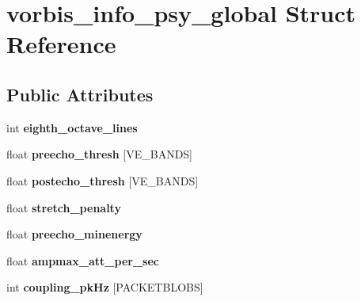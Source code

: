 \hypertarget{structvorbis__info__psy__global}{\section{vorbis\+\_\+info\+\_\+psy\+\_\+global Struct Reference}
\label{structvorbis__info__psy__global}
}
\subsection*{Public Attributes}
\begin{DoxyCompactItemize}
\item 
\hypertarget{structvorbis__info__psy__global_a88e8cf9fc8dd0de7562379558c4a1910}{int {\bfseries eighth\+\_\+octave\+\_\+lines}}\label{structvorbis__info__psy__global_a88e8cf9fc8dd0de7562379558c4a1910}

\item 
\hypertarget{structvorbis__info__psy__global_a6c556b0f7a648c916c9ff2042d1e63ab}{float {\bfseries preecho\+\_\+thresh} \mbox{[}V\+E\+\_\+\+B\+A\+N\+D\+S\mbox{]}}\label{structvorbis__info__psy__global_a6c556b0f7a648c916c9ff2042d1e63ab}

\item 
\hypertarget{structvorbis__info__psy__global_a9a413ec95a23be6ce0acb26684d1e13a}{float {\bfseries postecho\+\_\+thresh} \mbox{[}V\+E\+\_\+\+B\+A\+N\+D\+S\mbox{]}}\label{structvorbis__info__psy__global_a9a413ec95a23be6ce0acb26684d1e13a}

\item 
\hypertarget{structvorbis__info__psy__global_a18a1fc853e4c5a7fe425de4404a15637}{float {\bfseries stretch\+\_\+penalty}}\label{structvorbis__info__psy__global_a18a1fc853e4c5a7fe425de4404a15637}

\item 
\hypertarget{structvorbis__info__psy__global_a4b33ed2b895f683a5ed47ea81f65d7cf}{float {\bfseries preecho\+\_\+minenergy}}\label{structvorbis__info__psy__global_a4b33ed2b895f683a5ed47ea81f65d7cf}

\item 
\hypertarget{structvorbis__info__psy__global_ad928858e7853b161d92c034fdf654265}{float {\bfseries ampmax\+\_\+att\+\_\+per\+\_\+sec}}\label{structvorbis__info__psy__global_ad928858e7853b161d92c034fdf654265}

\item 
\hypertarget{structvorbis__info__psy__global_a46c3c0ac9f76869103f947718087458b}{int {\bfseries coupling\+\_\+pk\+Hz} \mbox{[}P\+A\+C\+K\+E\+T\+B\+L\+O\+B\+S\mbox{]}}\label{structvorbis__info__psy__global_a46c3c0ac9f76869103f947718087458b}


\end{DoxyCompactItemize}
